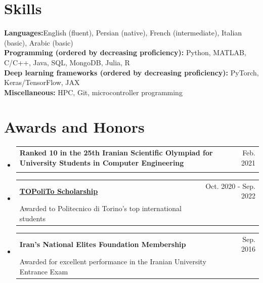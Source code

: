 \documentclass[A4,11pt]{article}
\makeatletter
\newcommand{\CVSubheading}[4]{
  \vspace{-2pt}\item
    \begin{tabular*}{0.97\textwidth}[t]{l@{\extracolsep{\fill}}r}
      \textbf{#1} & #2 \\
      \small#3 & \small #4 \\
    \end{tabular*}\vspace{-7pt}
}
\newcommand{\CVSubHeadingListStart}{\begin{itemize}[leftmargin=0.5cm, label={}]}
\newcommand{\CVSubHeadingListEnd}{\end{itemize}}
\makeatother
\begin{document}

\section{Skills}
 \begin{itemize}[leftmargin=0.5cm, label={}]
    \small{\item{
     \textbf{Languages:}{English (fluent), Persian (native), French (intermediate), Italian (basic), Arabic (basic)} \\
     \textbf{Programming (ordered by decreasing proficiency): }{Python, MATLAB, C/C++, Java, SQL, MongoDB, Julia, R} \\
     \textbf{Deep learning frameworks (ordered by decreasing proficiency): }{PyTorch, Keras/TensorFlow, JAX} \\
     \textbf{Miscellaneous: }{HPC, Git, microcontroller programming} \\
    }}
 \end{itemize}
    


\section{Awards and Honors}
  \CVSubHeadingListStart
     \CVSubheading
      {\small{Ranked 10 in the 25th Iranian Scientific Olympiad for University Students in Computer Engineering}}{\small{Feb. 2021}}{}{}
      \CVSubheading
      {\href{https://international.polito.it/financial_aid/topolito_scholarships}{\underline{\small{TOPoliTo Scholarship}}}}{\small{Oct. 2020 - Sep. 2022}}
      {\small{Awarded to Politecnico di Torino's top international students}}{}
      \CVSubheading
      {\small{Iran's National Elites Foundation Membership}}{\small{Sep. 2016}}
      {\small{Awarded for excellent performance in the Iranian University Entrance Exam}}{}
  \CVSubHeadingListEnd    
    

\end{document}
